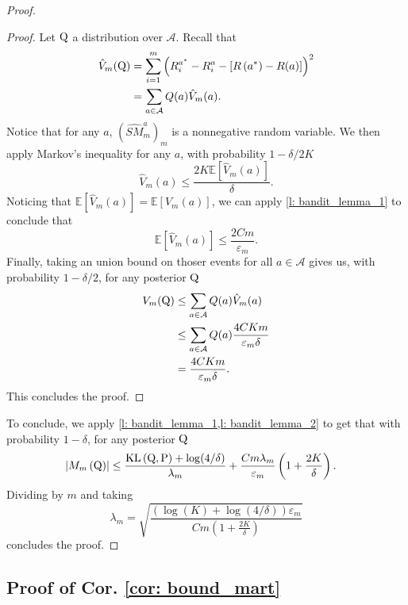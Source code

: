 \begin{proof}
\begin{proof}
Let $\mathrm{Q}$ a distribution over $\mathcal{A}$. Recall that
\begin{align*}
\hat{V}_m(\mathrm{Q}) & = \sum_{i=1}^m \left(R_i^{a^*}-R_i^a-\left[R\left(a^*\right)-R(a)\right]\right)^2 \\
& = \sum_{a\in\mathcal{A}} Q(a) \hat{V}_m(a).
\end{align*}
Notice that for any $a$, $(\hat{SM}_m^a)_m$ is a  nonnegative random variable. We then apply Markov's inequality for any $a$, with probability $1-\delta/2K$
\[ \hat{V}_m(a)\leq  \frac{2K\mathbb{E}[\hat{V}_m(a)]}{\delta} .  \]
Noticing that $\mathbb{E}[\hat{V}_m(a)] = \mathbb{E}[V_m(a)]$, we can apply \cref{l: bandit_lemma_1} to conclude that
$$\mathbb{E}[\hat{V}_m(a)] \leq \frac{2Cm}{\varepsilon_m}.$$
Finally, taking an union bound on thoser events for all $a\in\mathcal{A}$ gives us, with probability $1-\delta/2$, for any posterior $\mathrm{Q}$
\begin{align*}
V_m(\mathrm{Q}) & \leq \sum_{a\in\mathcal{A}} Q(a) \hat{V}_m(a) \\
& \leq \sum_{a\in\mathcal{A}} Q(a) \frac{4CKm}{\varepsilon_m\delta} \\
&= \frac{4CKm}{\varepsilon_m\delta}.
\end{align*}
This concludes the proof.
\end{proof}
To conclude, we apply \cref{l: bandit_lemma_1,l: bandit_lemma_2} to get that with probability $1-\delta$, for any posterior $\mathrm{Q}$
\begin{align*}
\left|M_m\left(\mathrm{Q}\right)\right| & \leq \frac{\operatorname{KL}\left(\mathrm{Q}, \mathrm{P}\right) +\log (4/\delta)}{\lambda_m}+ \frac{Cm\lambda_m}{\varepsilon_m} \left(1+ \frac{2K}{\delta}    \right).
\end{align*}
Dividing by $m$ and taking $$\lambda_m= \sqrt{\frac{\left(\log(K) +\log (4/\delta)\right) \varepsilon_m}{Cm\left(1+ \frac{2K}{\delta}    \right)}}$$ concludes the proof.

\end{proof}





\subsection{Proof of Cor. \ref{cor: bound_mart}}


